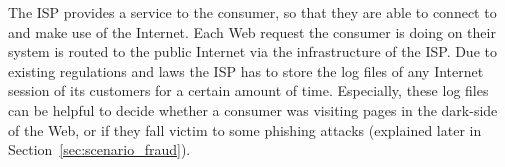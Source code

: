 The \gls{ISP} provides a service to the consumer, so that they are able to connect to and make use of the Internet. Each Web request the consumer is doing on their system is routed to the public Internet via the infrastructure of the \gls{ISP}. Due to existing regulations and laws the \gls{ISP} has to store the log files of any Internet session of its customers for a certain amount of time. Especially, these log files can be helpful to decide whether a consumer was visiting pages in the dark-side of the Web, or if they fall victim to some phishing attacks (explained later in Section~\ref{sec:scenario_fraud}).


